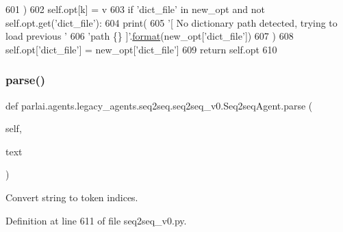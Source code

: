 \begin{DoxyCode}
601                 )
602             self.opt[k] = v
603         \textcolor{keywordflow}{if} \textcolor{stringliteral}{'dict\_file'} \textcolor{keywordflow}{in} new\_opt \textcolor{keywordflow}{and} \textcolor{keywordflow}{not} self.opt.get(\textcolor{stringliteral}{'dict\_file'}):
604             print(
605                 \textcolor{stringliteral}{'[ No dictionary path detected, trying to load previous '}
606                 \textcolor{stringliteral}{'path \{\} ]'}.\hyperlink{namespaceparlai_1_1chat__service_1_1services_1_1messenger_1_1shared__utils_a32e2e2022b824fbaf80c747160b52a76}{format}(new\_opt[\textcolor{stringliteral}{'dict\_file'}])
607             )
608             self.opt[\textcolor{stringliteral}{'dict\_file'}] = new\_opt[\textcolor{stringliteral}{'dict\_file'}]
609         \textcolor{keywordflow}{return} self.opt
610 
\end{DoxyCode}
\mbox{\label{classparlai_1_1agents_1_1legacy__agents_1_1seq2seq_1_1seq2seq__v0_1_1Seq2seqAgent_a073830870e283f88ee45a95c0ae8ad2f}} 
\subsubsection{\texorpdfstring{parse()}{parse()}}
{\footnotesize\ttfamily def parlai.\+agents.\+legacy\+\_\+agents.\+seq2seq.\+seq2seq\+\_\+v0.\+Seq2seq\+Agent.\+parse (\begin{DoxyParamCaption}\item[{}]{self,  }\item[{}]{text }\end{DoxyParamCaption})}

\begin{DoxyVerb}Convert string to token indices.
\end{DoxyVerb}
 

Definition at line 611 of file seq2seq\+\_\+v0.\+py.


